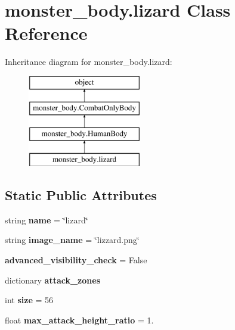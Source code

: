 \hypertarget{classmonster__body_1_1lizard}{}\section{monster\+\_\+body.\+lizard Class Reference}
\label{classmonster__body_1_1lizard}
Inheritance diagram for monster\+\_\+body.\+lizard\+:\begin{figure}[H]
\begin{center}
\leavevmode
\includegraphics[height=4.000000cm]{classmonster__body_1_1lizard}
\end{center}
\end{figure}
\subsection*{Static Public Attributes}
\begin{DoxyCompactItemize}
\item 
\hypertarget{classmonster__body_1_1lizard_aaf27b3179e104b0aa1726577166c1aaa}{}string {\bfseries name} = \char`\"{}lizard\char`\"{}\label{classmonster__body_1_1lizard_aaf27b3179e104b0aa1726577166c1aaa}

\item 
\hypertarget{classmonster__body_1_1lizard_a29b21387496a770f1964da8e56c9f426}{}string {\bfseries image\+\_\+name} = \char`\"{}lizzard.\+png\char`\"{}\label{classmonster__body_1_1lizard_a29b21387496a770f1964da8e56c9f426}

\item 
\hypertarget{classmonster__body_1_1lizard_a591cf47facb63abcbb21d52bd05f132e}{}{\bfseries advanced\+\_\+visibility\+\_\+check} = False\label{classmonster__body_1_1lizard_a591cf47facb63abcbb21d52bd05f132e}

\item 
dictionary {\bfseries attack\+\_\+zones}
\item 
\hypertarget{classmonster__body_1_1lizard_ab01e81a3969c86a54c6d251fa4335e40}{}int {\bfseries size} = 56\label{classmonster__body_1_1lizard_ab01e81a3969c86a54c6d251fa4335e40}

\item 
\hypertarget{classmonster__body_1_1lizard_a992e337303141259abfcb9205cfd4a69}{}float {\bfseries max\+\_\+attack\+\_\+height\+\_\+ratio} = 1.\label{classmonster__body_1_1lizard_a992e337303141259abfcb9205cfd4a69}

\end{DoxyCompactItemize}
